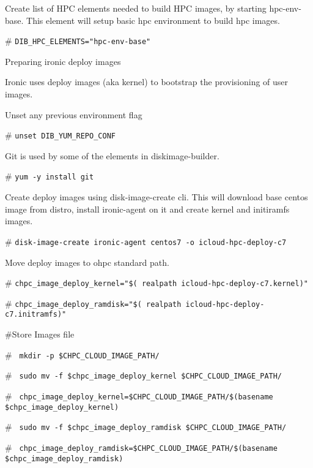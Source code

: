 \documentclass[12pt]{article}
\begin{document}
Create list of HPC elements needed to build HPC images, by starting hpc-env-base. This element will setup basic hpc environment to build hpc images.

\begin{bash}[ctrlr]\# \texttt{\small{DIB\_HPC\_ELEMENTS="hpc-env-base"}}\end{bash}

Preparing ironic deploy images 

Ironic uses deploy images (aka kernel) to bootstrap the provisioning of user images. 

Unset any previous environment flag

\begin{bash}[ctrlr]\# \texttt{\small{unset DIB\_YUM\_REPO\_CONF}}\end{bash}

Git is used by some of the elements in diskimage-builder. 

\begin{bash}[ctrlr]\# \texttt{\small{yum -y install git}}\end{bash}

Create deploy images using disk-image-create cli. This will download base centos image from distro, install ironic-agent on it and create kernel and initiramfs images.

\begin{bash}[ctrlr]\# \texttt{\small{disk-image-create ironic-agent centos7 -o icloud-hpc-deploy-c7}}\end{bash}

Move deploy images to ohpc standard path.

\begin{bash}[ctrlr]\# \texttt{\small{chpc\_image\_deploy\_kernel="\$( realpath icloud-hpc-deploy-c7.kernel)"}}\end{bash}
\begin{bash}[ctrlr]\# \texttt{\small{chpc\_image\_deploy\_ramdisk="\$( realpath icloud-hpc-deploy-c7.initramfs)"}}\end{bash}

 \#Store Images file

\begin{bash}[ctrlr]\# \texttt{\small{ mkdir -p \$CHPC\_CLOUD\_IMAGE\_PATH/}}\end{bash}
\begin{bash}[ctrlr]\# \texttt{\small{ sudo mv -f \$chpc\_image\_deploy\_kernel \$CHPC\_CLOUD\_IMAGE\_PATH/}}\end{bash}
\begin{bash}[ctrlr]\# \texttt{\small{ chpc\_image\_deploy\_kernel=\$CHPC\_CLOUD\_IMAGE\_PATH/\$(basename \$chpc\_image\_deploy\_kernel)}}\end{bash}
\begin{bash}[ctrlr]\# \texttt{\small{ sudo mv -f \$chpc\_image\_deploy\_ramdisk \$CHPC\_CLOUD\_IMAGE\_PATH/}}\end{bash}
\begin{bash}[ctrlr]\# \texttt{\small{ chpc\_image\_deploy\_ramdisk=\$CHPC\_CLOUD\_IMAGE\_PATH/\$(basename \$chpc\_image\_deploy\_ramdisk)}}\end{bash}
\end{document}
